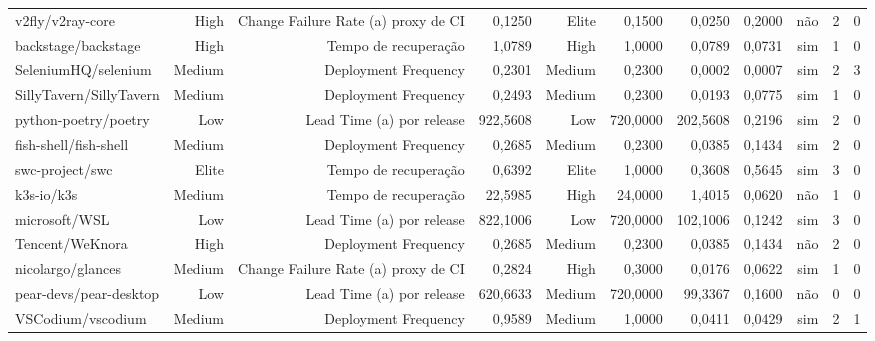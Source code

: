 \begin{tabular}{lrrrrrrrrrr}
v2fly/v2ray-core & High & Change Failure Rate (a) proxy de CI & 0,1250 & Elite & 0,1500 & 0,0250 & 0,2000 & não & 2 & 0 \\
backstage/backstage & High & Tempo de recuperação & 1,0789 & High & 1,0000 & 0,0789 & 0,0731 & sim & 1 & 0 \\
SeleniumHQ/selenium & Medium & Deployment Frequency & 0,2301 & Medium & 0,2300 & 0,0002 & 0,0007 & sim & 2 & 3 \\
SillyTavern/SillyTavern & Medium & Deployment Frequency & 0,2493 & Medium & 0,2300 & 0,0193 & 0,0775 & sim & 1 & 0 \\
python-poetry/poetry & Low & Lead Time (a) por release & 922,5608 & Low & 720,0000 & 202,5608 & 0,2196 & sim & 2 & 0 \\
fish-shell/fish-shell & Medium & Deployment Frequency & 0,2685 & Medium & 0,2300 & 0,0385 & 0,1434 & sim & 2 & 0 \\
swc-project/swc & Elite & Tempo de recuperação & 0,6392 & Elite & 1,0000 & 0,3608 & 0,5645 & sim & 3 & 0 \\
k3s-io/k3s & Medium & Tempo de recuperação & 22,5985 & High & 24,0000 & 1,4015 & 0,0620 & não & 1 & 0 \\
microsoft/WSL & Low & Lead Time (a) por release & 822,1006 & Low & 720,0000 & 102,1006 & 0,1242 & sim & 3 & 0 \\
Tencent/WeKnora & High & Deployment Frequency & 0,2685 & Medium & 0,2300 & 0,0385 & 0,1434 & não & 2 & 0 \\
nicolargo/glances & Medium & Change Failure Rate (a) proxy de CI & 0,2824 & High & 0,3000 & 0,0176 & 0,0622 & sim & 1 & 0 \\
pear-devs/pear-desktop & Low & Lead Time (a) por release & 620,6633 & Medium & 720,0000 & 99,3367 & 0,1600 & não & 0 & 0 \\
VSCodium/vscodium & Medium & Deployment Frequency & 0,9589 & Medium & 1,0000 & 0,0411 & 0,0429 & sim & 2 & 1 \\
\hline
\end{tabular}
